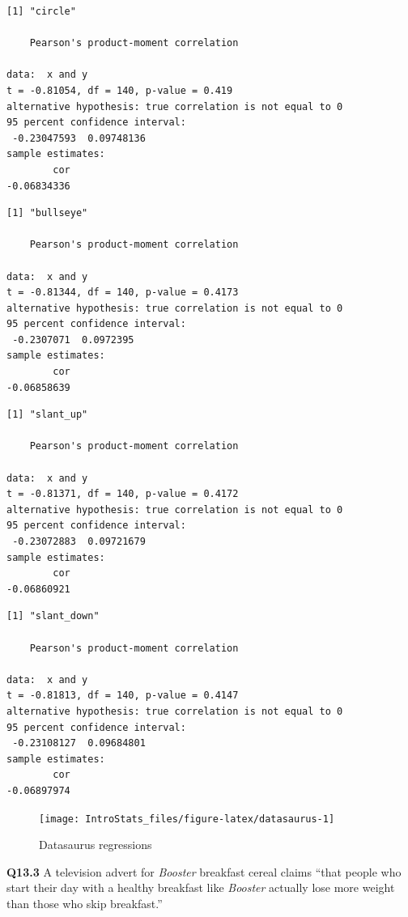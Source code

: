\documentclass[
  oneside]{krantz}
\begin{document}
\begin{verbatim}
[1] "circle"

    Pearson's product-moment correlation

data:  x and y
t = -0.81054, df = 140, p-value = 0.419
alternative hypothesis: true correlation is not equal to 0
95 percent confidence interval:
 -0.23047593  0.09748136
sample estimates:
        cor 
-0.06834336 
\end{verbatim}

\begin{verbatim}
[1] "bullseye"

    Pearson's product-moment correlation

data:  x and y
t = -0.81344, df = 140, p-value = 0.4173
alternative hypothesis: true correlation is not equal to 0
95 percent confidence interval:
 -0.2307071  0.0972395
sample estimates:
        cor 
-0.06858639 
\end{verbatim}

\begin{verbatim}
[1] "slant_up"

    Pearson's product-moment correlation

data:  x and y
t = -0.81371, df = 140, p-value = 0.4172
alternative hypothesis: true correlation is not equal to 0
95 percent confidence interval:
 -0.23072883  0.09721679
sample estimates:
        cor 
-0.06860921 
\end{verbatim}

\begin{verbatim}
[1] "slant_down"

    Pearson's product-moment correlation

data:  x and y
t = -0.81813, df = 140, p-value = 0.4147
alternative hypothesis: true correlation is not equal to 0
95 percent confidence interval:
 -0.23108127  0.09684801
sample estimates:
        cor 
-0.06897974 
\end{verbatim}

\begin{figure}

{\centering \texttt{[image: IntroStats\_files/figure-latex/datasaurus-1]} 

}

\caption{Datasaurus regressions}\label{fig:datasaurus}
\end{figure}

\textbf{Q13.3} A television advert for \emph{Booster} breakfast cereal claims ``that people who start their day with a healthy breakfast like \emph{Booster} actually lose more weight than those who skip breakfast.''
\end{document}
